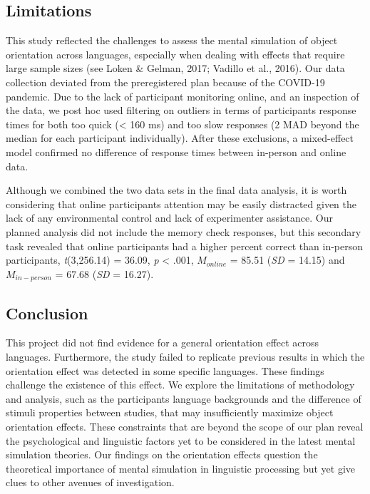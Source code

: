 \documentclass[
  man,floatsintext]{apa7}
\begin{document}
\hypertarget{limitations}{%
\subsection{Limitations}\label{limitations}}

This study reflected the challenges to assess the mental simulation of
object orientation across languages, especially when dealing with
effects that require large sample sizes (see Loken \& Gelman, 2017; Vadillo et al., 2016). Our data collection deviated from
the preregistered plan because of the COVID-19 pandemic. Due to the lack
of participant monitoring online, and an inspection of the data, we post
hoc used filtering on outliers in terms of participants\textquotesingle{} response times
for both too quick (\textless{} 160 ms) and too slow responses (2 MAD beyond the
median for each participant individually). After these exclusions, a
mixed-effect model confirmed no difference of response times between
in-person and online data.

Although we combined the two data sets in the final data analysis, it is
worth considering that online participants\textquotesingle{} attention may be easily
distracted given the lack of any environmental control and lack of
experimenter assistance. Our planned analysis did not include the memory
check responses, but this secondary task revealed that online
participants had a higher percent correct than in-person participants, \emph{t}(3,256.14) = 36.09, \emph{p} \textless{} .001, \(M_{online}\) = 85.51 (\emph{SD} = 14.15) and \(M_{in-person}\) = 67.68 (\emph{SD} = 16.27).

\hypertarget{conclusion}{%
\subsection{Conclusion}\label{conclusion}}

This project did not find evidence for a general orientation effect
across languages. Furthermore, the study failed to replicate previous
results in which the orientation effect was detected in some specific
languages. These findings challenge the existence of this effect. We
explore the limitations of methodology and analysis, such as the
participants\textquotesingle{} language backgrounds and the difference of stimuli
properties between studies, that may insufficiently maximize object
orientation effects. These constraints that are beyond the scope of our
plan reveal the psychological and linguistic factors yet to be
considered in the latest mental simulation theories. Our findings on the
orientation effects question the theoretical importance of mental
simulation in linguistic processing but yet give clues to other avenues
of investigation.
\end{document}
